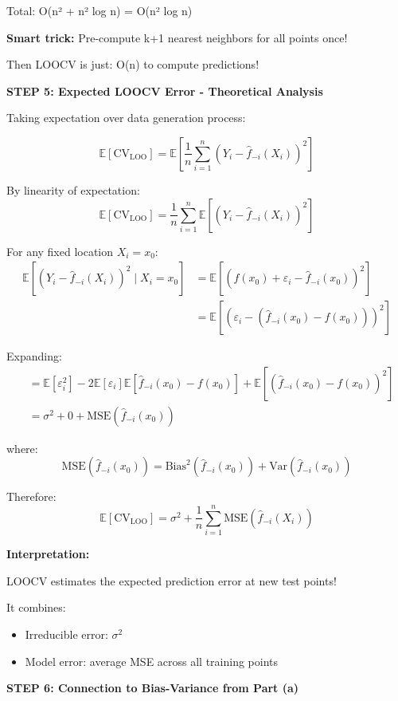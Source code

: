 \documentclass[12pt]{article}
\begin{document}
\begin{solution}
Total: O(n² + n² log n) = O(n² log n)

\textbf{Smart trick:} Pre-compute k+1 nearest neighbors for all points once!

Then LOOCV is just: O(n) to compute predictions!

\textbf{STEP 5: Expected LOOCV Error - Theoretical Analysis}

Taking expectation over data generation process:

\[
\mathbb{E}[\text{CV}_{\text{LOO}}] = \mathbb{E}\left[\frac{1}{n}\sum_{i=1}^n (Y_i - \hat{f}_{-i}(X_i))^2\right]
\]

By linearity of expectation:
\[
\mathbb{E}[\text{CV}_{\text{LOO}}] = \frac{1}{n}\sum_{i=1}^n \mathbb{E}\left[(Y_i - \hat{f}_{-i}(X_i))^2\right]
\]

For any fixed location $X_i = x_0$:
\begin{align*}
\mathbb{E}\left[(Y_i - \hat{f}_{-i}(X_i))^2 \mid X_i = x_0\right] &= \mathbb{E}\left[(f(x_0) + \varepsilon_i - \hat{f}_{-i}(x_0))^2\right] \\
&= \mathbb{E}\left[(\varepsilon_i - (\hat{f}_{-i}(x_0) - f(x_0)))^2\right]
\end{align*}

Expanding:
\begin{align*}
&= \mathbb{E}[\varepsilon_i^2] - 2\mathbb{E}[\varepsilon_i]\mathbb{E}[\hat{f}_{-i}(x_0) - f(x_0)] + \mathbb{E}[(\hat{f}_{-i}(x_0) - f(x_0))^2] \\
&= \sigma^2 + 0 + \text{MSE}(\hat{f}_{-i}(x_0))
\end{align*}

where:
\[
\text{MSE}(\hat{f}_{-i}(x_0)) = \text{Bias}^2(\hat{f}_{-i}(x_0)) + \text{Var}(\hat{f}_{-i}(x_0))
\]

Therefore:
\[
\boxed{
\mathbb{E}[\text{CV}_{\text{LOO}}] = \sigma^2 + \frac{1}{n}\sum_{i=1}^n \text{MSE}(\hat{f}_{-i}(X_i))
}
\]

\textbf{Interpretation:}

LOOCV estimates the expected prediction error at new test points!

It combines:
\begin{itemize}
    \item Irreducible error: $\sigma^2$
    \item Model error: average MSE across all training points
\end{itemize}

\textbf{STEP 6: Connection to Bias-Variance from Part (a)}


\end{solution}
\end{document}

